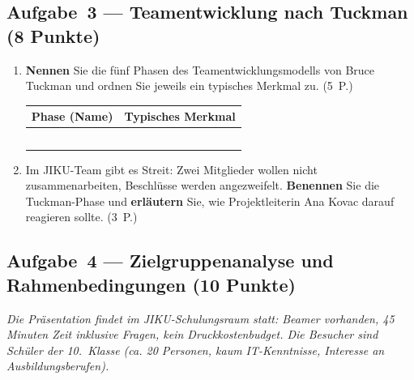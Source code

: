 \documentclass[11pt, a4paper]{article}
\begin{document}
\subsection*{Aufgabe~3 --- Teamentwicklung nach Tuckman (8 Punkte)}

\begin{enumerate}[label=(\alph*)]
  \item \textbf{Nennen} Sie die fünf Phasen des Teamentwicklungsmodells von Bruce Tuckman
  und ordnen Sie jeweils ein typisches Merkmal zu. \hfill (5~P.)

  \bigskip

  \noindent
  \begin{tabular}{|p{3.5cm}|p{8.5cm}|}
  \hline
  \textbf{Phase (Name)} & \textbf{Typisches Merkmal}\\
  \hline
   & \\[1.0cm]
  \hline
   & \\[1.0cm]
  \hline
   & \\[1.0cm]
  \hline
   & \\[1.0cm]
  \hline
   & \\[1.0cm]
  \hline
  \end{tabular}

  \bigskip

  \item Im JIKU-Team gibt es Streit: Zwei Mitglieder wollen nicht zusammenarbeiten, Beschlüsse
  werden angezweifelt. \textbf{Benennen} Sie die Tuckman-Phase und \textbf{erläutern} Sie,
  wie Projektleiterin Ana Kovac darauf reagieren sollte. \hfill (3~P.)

  \vspace{6cm}
\end{enumerate}

\subsection*{Aufgabe~4 --- Zielgruppenanalyse und Rahmenbedingungen (10 Punkte)}

\textit{Die Präsentation findet im JIKU-Schulungsraum statt: Beamer vorhanden, 45 Minuten Zeit
inklusive Fragen, kein Druckkostenbudget. Die Besucher sind Schüler der 10.~Klasse
(ca. 20 Personen, kaum IT-Kenntnisse, Interesse an Ausbildungsberufen).}
\end{document}
